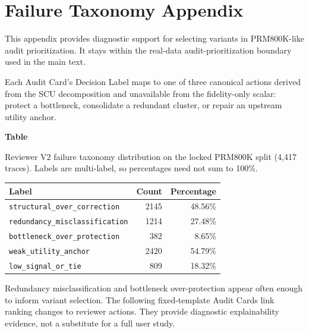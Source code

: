 \documentclass[a4paper,fleqn]{cas-sc}
\begin{document}
\clearpage
\appendix

\section{Failure Taxonomy Appendix}
\label{app:failure-taxonomy}

This appendix provides diagnostic support for selecting variants in PRM800K-like audit prioritization. It stays within the real-data audit-prioritization boundary used in the main text.

Each Audit Card's Decision Label maps to one of three canonical actions derived from the SCU decomposition and unavailable from the fidelity-only scalar: protect a bottleneck, consolidate a redundant cluster, or repair an upstream utility anchor.

\par\medskip
{}\label{tab:failure-taxonomy}
\noindent\textbf{Table~\thetable}\par
\noindent Reviewer V2 failure taxonomy distribution on the locked PRM800K split (4,417 traces). Labels are multi-label, so percentages need not sum to 100\%.
\begin{center}
\small
\renewcommand{\arraystretch}{1.08}
\begin{tabular}{lrr}
\toprule
\textbf{Label} & \textbf{Count} & \textbf{Percentage} \\
\midrule
\texttt{structural\_over\_correction} & 2145 & 48.56\% \\
\texttt{redundancy\_misclassification} & 1214 & 27.48\% \\
\texttt{bottleneck\_over\_protection} & 382 & 8.65\% \\
\texttt{weak\_utility\_anchor} & 2420 & 54.79\% \\
\texttt{low\_signal\_or\_tie} & 809 & 18.32\% \\
\bottomrule
\end{tabular}
\end{center}
\medskip

Redundancy misclassification and bottleneck over-protection appear often enough to inform variant selection. The following fixed-template Audit Cards link ranking changes to reviewer actions. They provide diagnostic explainability evidence, not a substitute for a full user study.
\end{document}

